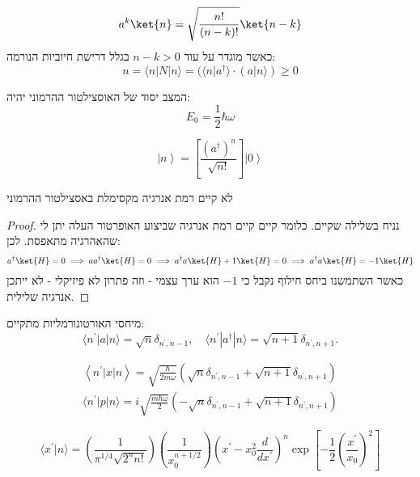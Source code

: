 \documentclass{tstextbook}
\begin{document}
\begin{proposition}
$$a^k\ket{n} =\sqrt{ \frac{n!}{(n-k)!} }\ket{n-k} $$
כאשר מוגדר על עוד \(n-k>0\) בגלל דרישת חיוביות הנורמה:
$$n=\langle n|N|n\rangle=(\langle n|a^{\dagger}\rangle\cdot(a|n\rangle)\geq0$$

\end{proposition}
\begin{corollary}
המצב יסוד של האוסצילטור ההרמוני יהיה:
$$E_{0}={\frac{1}{2}}\hbar\omega$$

\end{corollary}
\begin{corollary}
$$\left|n\right\rangle=\left[\frac{(a^{\dagger})^{n}}{\sqrt{n!}}\right]\left|0\right\rangle$$

\end{corollary}
\begin{proposition}
לא קיים רמת אנרגיה מקסימלת באסצילטור ההרמוני

\end{proposition}
\begin{proof}
נניח בשלילה שקיים. כלומר קיים קיים רמת אנרגיה שביצוע האופרטור העלה יתן לי שהאהרגיה מתאפסת. לכן:
$$a^{\dagger}\ket{H} =0\implies aa^{\dagger}\ket{H} =0\implies a^{\dagger}a\ket{H} +1\ket{H} =0\implies a^{\dagger}a\ket{H} =-1\ket{H} $$
כאשר השתמשנו ביחס חילוף נקבל כי \(-1\) הוא ערך עצמי - וזה פתרון לא פיזיקלי - לא ייתכן אנרגיה שלילית.

\end{proof}
\begin{proposition}
מיחסי האורטונורמליות מתקיים:
$$\langle n^{\prime}|a|n\rangle=\sqrt{n}\delta_{n^{\prime},n-1},\quad\langle n^{\prime}|a^{\dagger}|n\rangle=\sqrt{n+1}\delta_{n^{\prime},n+1}.$$

\end{proposition}
\begin{proposition}
$$\begin{gather}\left\langle  n^{\prime}|x|n \right\rangle=\sqrt{\frac{\hbar}{2m\omega}}\left( \sqrt{n}\delta_{n^{\prime},n-1}+\sqrt{n+1}\delta_{n^{\prime},n+1} \right)  \\\langle n^{\prime}|p|n\rangle=i\sqrt{\frac{m\hbar\omega}{2}}(-\sqrt{n}\delta_{n^{\prime},n-1}+\sqrt{n+1}\delta_{n^{\prime},n+1})
\end{gather}$$

\end{proposition}
\begin{proposition}
$$\langle x^{\prime}|n\rangle=\left(\frac{1}{\pi^{1/4}\sqrt{2^{n}n!}}\right)\left(\frac{1}{x_{0}^{n+1/2}}\right)\left(x^{\prime}-x_{0}^{2}\frac{d}{d x^{\prime}}\right)^{n}\exp{\left[-\frac{1}{2}\left(\frac{x^{\prime}}{x_{0}}\right)^{2}\right]}$$

\end{proposition}
\end{document}
